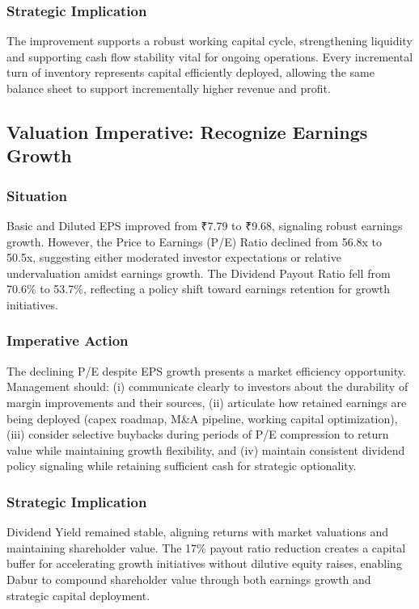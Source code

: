 \documentclass[12pt, a4paper]{report}
\begin{document}
\subsubsection{Strategic Implication}
The improvement supports a robust working capital cycle, strengthening liquidity and supporting cash flow stability vital for ongoing operations. Every incremental turn of inventory represents capital efficiently deployed, allowing the same balance sheet to support incrementally higher revenue and profit.

\subsection{Valuation Imperative: Recognize Earnings Growth}

\subsubsection{Situation}
Basic and Diluted EPS improved from ₹7.79 to ₹9.68, signaling robust earnings growth. However, the Price to Earnings (P/E) Ratio declined from 56.8x to 50.5x, suggesting either moderated investor expectations or relative undervaluation amidst earnings growth. The Dividend Payout Ratio fell from 70.6\% to 53.7\%, reflecting a policy shift toward earnings retention for growth initiatives.

\subsubsection{Imperative Action}
The declining P/E despite EPS growth presents a market efficiency opportunity. Management should: (i) communicate clearly to investors about the durability of margin improvements and their sources, (ii) articulate how retained earnings are being deployed (capex roadmap, M\&A pipeline, working capital optimization), (iii) consider selective buybacks during periods of P/E compression to return value while maintaining growth flexibility, and (iv) maintain consistent dividend policy signaling while retaining sufficient cash for strategic optionality.

\subsubsection{Strategic Implication}
Dividend Yield remained stable, aligning returns with market valuations and maintaining shareholder value. The 17\% payout ratio reduction creates a capital buffer for accelerating growth initiatives without dilutive equity raises, enabling Dabur to compound shareholder value through both earnings growth and strategic capital deployment.
\end{document}
